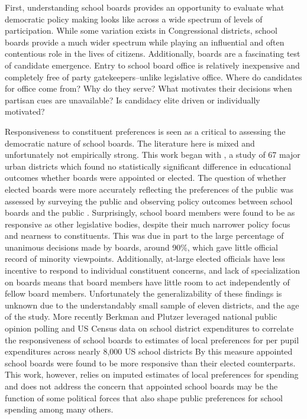 First, understanding school boards provides an opportunity to evaluate what 
democratic policy making looks like across a wide spectrum of levels of participation. 
While some variation exists in Congressional districts, school boards provide a 
much wider spectrum while playing an influential and often contentious role in the 
lives of citizens. Additionally, boards are a fascinating test of candidate 
emergence. Entry to school board office is relatively inexpensive and completely 
free of party gatekeepers--unlike legislative office. Where do candidates for 
office come from? Why do they serve? What motivates their decisions when partisan 
cues are unavailable? Is candidacy elite driven or individually motivated? 
 
Responsiveness to constituent preferences is seen as a critical to assessing the 
democratic nature of school boards. The literature here is mixed and unfortunately 
not empirically strong. This work began with \citet{RefWorks:224}, a study of 67 major 
urban districts which found no statistically significant difference in educational 
outcomes whether boards were appointed or elected. The question of whether elected 
boards were more accurately reflecting the preferences of the public was assessed 
by surveying the public and observing policy outcomes between school boards and 
the public \citep{RefWorks:226,RefWorks:331}. Surprisingly, school board members 
were found to be as responsive as other legislative bodies, despite their much 
narrower policy focus and nearness to constituents. This was due in part to the 
large percentage of unanimous decisions made by boards, around 90\%, which gave 
little official record of minority viewpoints. Additionally, at-large elected 
officials have less incentive to respond to individual constituent concerns, and 
lack of specialization on boards means that board members have little room to act 
independently of fellow board members. Unfortunately the generalizability of these 
findings is unknown due to the understandably small sample of eleven districts, 
and the age of the study. More recently Berkman and Plutzer leveraged national 
public opinion polling and US Census data on school district expenditures to correlate 
the responsiveness of school boards to estimates of local preferences for per pupil 
expenditures across nearly 8,000 US school districts \citep{RefWorks:332} By 
this measure appointed school boards were found to be more responsive than their 
elected counterparts. This work, however, relies on imputed estimates of local 
preferences for spending and does not address the concern that appointed school 
boards may be the function of some political forces that also shape public preferences 
for school spending among many others.

